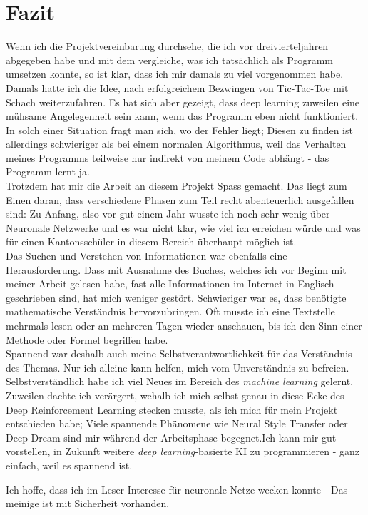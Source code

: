 \documentclass[12pt,a4paper]{article}
\begin{document}
\section{Fazit}
Wenn ich die Projektvereinbarung durchsehe, die ich vor dreivierteljahren abgegeben habe und mit dem vergleiche, was ich tatsächlich als Programm umsetzen konnte, so ist klar, dass ich mir damals zu viel vorgenommen habe. 
Damals hatte ich die Idee, nach erfolgreichem Bezwingen von Tic-Tac-Toe mit Schach weiterzufahren. Es hat sich aber gezeigt, dass deep learning zuweilen eine mühsame Angelegenheit sein kann, wenn das Programm eben nicht funktioniert. In solch einer Situation fragt man sich, wo der Fehler liegt; Diesen zu finden ist allerdings schwieriger als bei einem normalen Algorithmus, weil das Verhalten meines Programms teilweise nur indirekt von meinem Code abhängt - das Programm lernt ja.
\\
Trotzdem hat mir die Arbeit an diesem Projekt Spass gemacht. Das liegt zum Einen daran, dass verschiedene Phasen zum Teil recht abenteuerlich ausgefallen sind: Zu Anfang, also vor gut einem Jahr wusste ich noch sehr wenig über Neuronale Netzwerke und es war nicht klar, wie viel ich erreichen würde und was für einen Kantonsschüler in diesem Bereich überhaupt möglich ist. \\
Das Suchen und Verstehen von Informationen war ebenfalls eine Herausforderung. Dass mit Ausnahme des Buches\cite{pinkbook}, welches ich vor Beginn mit meiner Arbeit gelesen habe, fast alle Informationen im Internet in Englisch geschrieben sind, hat mich weniger gestört. Schwieriger war es, dass benötigte mathematische Verständnis hervorzubringen. Oft musste ich eine Textstelle mehrmals lesen oder an mehreren Tagen wieder anschauen, bis ich den Sinn einer Methode oder Formel begriffen habe.\\
Spannend war deshalb auch meine Selbstverantwortlichkeit für das Verständnis des Themas. Nur ich alleine kann helfen, mich vom Unverständnis zu befreien. 
\\
Selbstverständlich habe ich viel Neues im Bereich des \textit{machine learning} gelernt. Zuweilen dachte ich verärgert, wehalb ich mich selbst genau in diese Ecke des Deep Reinforcement Learning stecken musste, als ich mich für mein Projekt entschieden habe; Viele spannende Phänomene wie Neural Style Transfer oder Deep Dream sind mir während der Arbeitsphase begegnet.Ich kann mir gut vorstellen, in Zukunft weitere \textit{deep learning}-basierte KI zu programmieren - ganz einfach, weil es spannend ist.\par
Ich hoffe, dass ich im Leser Interesse für neuronale Netze wecken konnte - Das meinige ist mit Sicherheit vorhanden.

\newpage
\printbibliography
\end{document}
